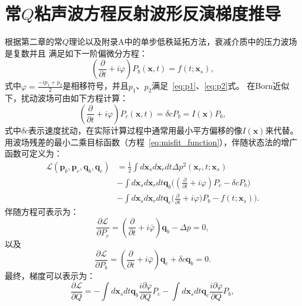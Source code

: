 \chapter{常$Q$粘声波方程反射波形反演梯度推导}
\label{chp:dcq}
根据第二章的常$Q$理论以及附录A中的单步低秩延拓方法，衰减介质中的压力波场是复数并且
满足如下一阶偏微分方程：
\begin{equation}
    (\frac{\partial}{\partial t} + i\varphi)P_b(\mathbf{x},t)=f(t;\mathbf{x}_s),
\end{equation}
式中$\varphi=\frac{-ip_1+p_2}{2}$是相移符号，并且$p_1$、$p_2$满足~\ref{eq:p1}、\ref{eq:p2}式。
在Born近似下，扰动波场可由如下方程计算：
\begin{equation}
	(\frac{\partial}{\partial t} +
	i\varphi)P_c(\mathbf{x},t)={\delta cP_b=I(\mathbf{x})P_b},
\end{equation}
式中$\delta c$表示速度扰动，在实际计算过程中通常用最小平方偏移的像$I(\mathbf{x})$来代替。
用波场残差的最小二乘目标函数（方程~\ref{eq:misfit_function}），伴随状态法的增广函数可定义为：
    \begin{equation}
        \begin{aligned}
            \mathcal{L}(\mathbf{p}_b,\mathbf{p}_c,\mathbf{q}_b,\mathbf{q}_c)
            &=\frac{1}{2}\int d\mathbf{x}_sd\mathbf{x}_rdt\Delta p^2(\mathbf{x}_r,t;\mathbf{x}_s) \\
            &-\int d\mathbf{x}_sd\mathbf{x}_rdt
            \mathbf{q}_b\Big((\frac{\partial}{\partial t} + i\varphi)P_c-\delta
            cP_b\Big) \\
            &-\int d\mathbf{x}_sd\mathbf{x}_rdt
            \mathbf{q}_c\Big(\frac{\partial}{\partial t} +
            i\varphi)P_b-f(t;\mathbf{x}_s)\Big).
    \end{aligned}
    \end{equation}
伴随方程可表示为：
    \begin{equation}
        \frac{\partial\mathcal{L}}{\partial P_c} =
        (\frac{\partial}{\partial t} +i\bar{\varphi})\mathbf{q}_b-\Delta p=0,
    \end{equation}
    以及
    \begin{equation}
        \frac{\partial\mathcal{L}}{\partial P_b} =
        (\frac{\partial}{\partial t} +i\bar{\varphi})\mathbf{q}_c+\delta
        c\mathbf{q}_b=0.
    \end{equation}
最终，梯度可以表示为：
    \begin{equation}
        \frac{\partial\mathcal{L}}{\partial Q}=-\int
        d\mathbf{x}_sdt\mathbf{q}_b\frac{i\partial\varphi}{\partial Q}P_c - \int
        d\mathbf{x}_sdt\mathbf{q}_c\frac{i\partial\varphi}{\partial Q}P_b,
    \end{equation}
